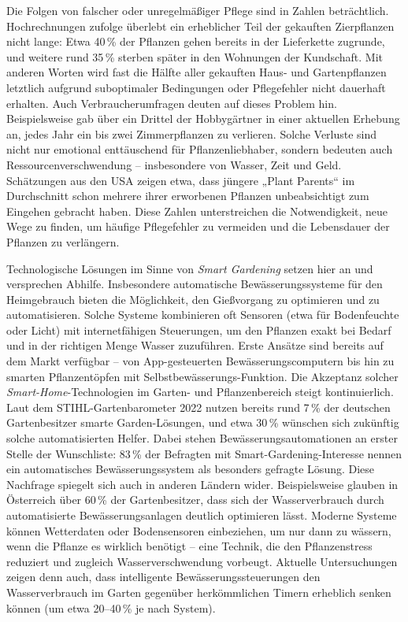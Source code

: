 Die Folgen von falscher oder unregelmäßiger Pflege sind in Zahlen beträchtlich. Hochrechnungen zufolge überlebt ein erheblicher Teil der gekauften Zierpflanzen nicht lange: Etwa 40\,\% der Pflanzen gehen bereits in der Lieferkette zugrunde, und weitere rund 35\,\% sterben später in den Wohnungen der Kundschaft\autocite{pflanzensterben_statistik}. Mit anderen Worten wird fast die Hälfte aller gekauften Haus- und Gartenpflanzen letztlich aufgrund suboptimaler Bedingungen oder Pflegefehler nicht dauerhaft erhalten. Auch Verbraucherumfragen deuten auf dieses Problem hin. Beispielsweise gab über ein Drittel der Hobbygärtner in einer aktuellen Erhebung an, jedes Jahr ein bis zwei Zimmerpflanzen zu verlieren\autocite{pflanzensterben_statistik}. Solche Verluste sind nicht nur emotional enttäuschend für Pflanzenliebhaber, sondern bedeuten auch Ressourcenverschwendung – insbesondere von Wasser, Zeit und Geld. Schätzungen aus den USA zeigen etwa, dass jüngere „Plant Parents“ im Durchschnitt schon mehrere ihrer erworbenen Pflanzen unbeabsichtigt zum Eingehen gebracht haben. Diese Zahlen unterstreichen die Notwendigkeit, neue Wege zu finden, um häufige Pflegefehler zu vermeiden und die Lebensdauer der Pflanzen zu verlängern.

Technologische Lösungen im Sinne von \textit{Smart Gardening} setzen hier an und versprechen Abhilfe. Insbesondere automatische Bewässerungssysteme für den Heimgebrauch bieten die Möglichkeit, den Gießvorgang zu optimieren und zu automatisieren. Solche Systeme kombinieren oft Sensoren (etwa für Bodenfeuchte oder Licht) mit internetfähigen Steuerungen, um den Pflanzen exakt bei Bedarf und in der richtigen Menge Wasser zuzuführen. Erste Ansätze sind bereits auf dem Markt verfügbar – von App-gesteuerten Bewässerungscomputern bis hin zu smarten Pflanzentöpfen mit Selbstbewässerungs-Funktion. Die Akzeptanz solcher \textit{Smart-Home}-Technologien im Garten- und Pflanzenbereich steigt kontinuierlich. Laut dem STIHL-Gartenbarometer 2022 nutzen bereits rund 7\,\% der deutschen Gartenbesitzer smarte Garden-Lösungen, und etwa 30\,\% wünschen sich zukünftig solche automatisierten Helfer\autocite{stihl_gartenbarometer}. Dabei stehen Bewässerungsautomationen an erster Stelle der Wunschliste: 83\,\% der Befragten mit Smart-Gardening-Interesse nennen ein automatisches Bewässerungssystem als besonders gefragte Lösung. Diese Nachfrage spiegelt sich auch in anderen Ländern wider. Beispielsweise glauben in Österreich über 60\,\% der Gartenbesitzer, dass sich der Wasserverbrauch durch automatisierte Bewässerungsanlagen deutlich optimieren lässt. Moderne Systeme können Wetterdaten oder Bodensensoren einbeziehen, um nur dann zu wässern, wenn die Pflanze es wirklich benötigt – eine Technik, die den Pflanzenstress reduziert und zugleich Wasserverschwendung vorbeugt. Aktuelle Untersuchungen zeigen denn auch, dass intelligente Bewässerungssteuerungen den Wasserverbrauch im Garten gegenüber herkömmlichen Timern erheblich senken können (um etwa 20–40\,\% je nach System).


